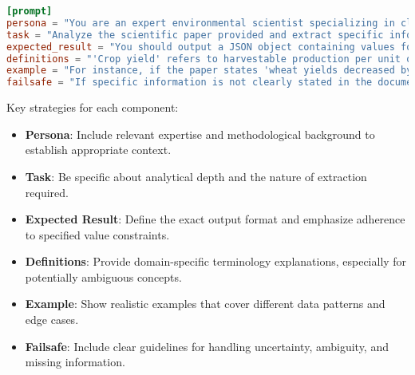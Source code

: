 \begin{configbox}
\begin{lstlisting}[language=TOML]
[prompt]
persona = "You are an expert environmental scientist specializing in climate change impacts on agriculture, with experience conducting systematic reviews according to PRISMA guidelines."
task = "Analyze the scientific paper provided and extract specific information about climate change impacts on crop yields, methodology used, and adaptation strategies discussed."
expected_result = "You should output a JSON object containing values for each key specified in the review structure. Values must adhere exactly to the prescribed formats and vocabulary."
definitions = "'Crop yield' refers to harvestable production per unit of land area. 'Statistical significance' means p < 0.05 unless otherwise specified in the paper. 'Adaptation strategies' include any interventions meant to reduce negative climate impacts on agriculture."
example = "For instance, if the paper states 'wheat yields decreased by 5.2% (p < 0.01) per degree Celsius warming, with irrigation mitigating 40% of losses', you would extract: {\"crop_type\": \"wheat\", \"climate_factor\": \"temperature increase\", \"yield_impact\": \"-5.2% per °C\", \"statistical_significance\": \"yes\", \"adaptation_strategies_discussed\": \"yes\", \"adaptation_effectiveness\": \"40% loss reduction\"}"
failsafe = "If specific information is not clearly stated in the document, do not speculate or infer beyond reasonable scientific interpretation. Respond with an empty string for missing data. If the paper doesn't address the topic at all, use 'not addressed' for categorical fields."
\end{lstlisting}
\end{configbox}

Key strategies for each component:

\begin{itemize}
    \item \textbf{Persona}: Include relevant expertise and methodological background to establish appropriate context.
    \item \textbf{Task}: Be specific about analytical depth and the nature of extraction required.
    \item \textbf{Expected Result}: Define the exact output format and emphasize adherence to specified value constraints.
    \item \textbf{Definitions}: Provide domain-specific terminology explanations, especially for potentially ambiguous concepts.
    \item \textbf{Example}: Show realistic examples that cover different data patterns and edge cases.
    \item \textbf{Failsafe}: Include clear guidelines for handling uncertainty, ambiguity, and missing information.
\end{itemize}


